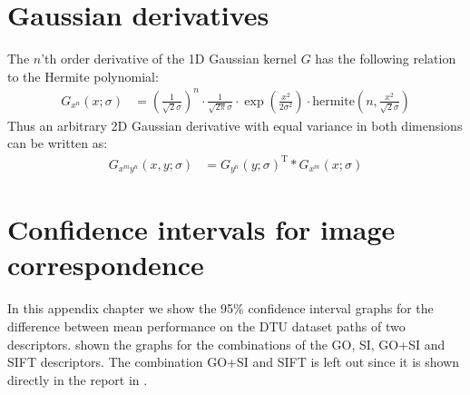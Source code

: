 \documentclass[thesis.tex]{subfiles}
\begin{document}
\chapter{Gaussian derivatives}
%
The $n$'th order derivative of the 1D Gaussian kernel $G$ has the following relation to the Hermite polynomial:
%
\begin{align*}
	G_{x^n}(x;\sigma) &= \left(\frac{1}{\sqrt{2}\sigma}\right)^n \cdot
						 \frac{1}{\sqrt{2\pi}\sigma} \cdot
						 \exp \left( \frac{x^2}{2\sigma^2} \right) \cdot
						 \text{hermite} \left(n,\frac{x^2}{\sqrt{2}\sigma} \right)
\end{align*}
%
Thus an arbitrary 2D Gaussian derivative with equal variance in both dimensions can be written as:
%
\begin{align*}
	G_{x^m y^n}(x,y;\sigma) &=
						G_{y^n}(y;\sigma)^\text{T} \ast G_{x^m}(x;\sigma)
\end{align*}

\chapter{Confidence intervals for image correspondence}
\label{apx:confidenceIntervals}
In this appendix chapter we show the 95\% confidence interval graphs for the difference between mean performance on the DTU dataset paths of two descriptors.  shown the graphs for the combinations of the GO, SI, GO+SI and SIFT descriptors. The combination GO+SI and SIFT is left out since it is shown directly in the report in .
\end{document}
